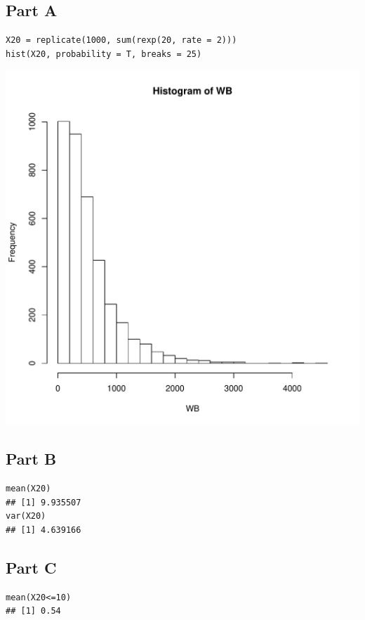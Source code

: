 \documentclass{article}\usepackage[]{graphicx}\usepackage[]{color}
\makeatletter
\newenvironment{kframe}{%
 \def\at@end@of@kframe{}%
 \ifinner\ifhmode%
  \def\at@end@of@kframe{\end{minipage}}%
  \begin{minipage}{\columnwidth}%
 \fi\fi%
 \def\FrameCommand##1{\hskip\@totalleftmargin \hskip-\fboxsep
 \colorbox{shadecolor}{##1}\hskip-\fboxsep
     \hskip-\linewidth \hskip-\@totalleftmargin \hskip\columnwidth}%
 \MakeFramed {\advance\hsize-\width
   \@totalleftmargin\z@ \linewidth\hsize
   \@setminipage}}%
 {\par\unskip\endMakeFramed%
 \at@end@of@kframe}
\newenvironment{knitrout}{}{} %
\makeatother
\begin{document}
\subsection*{Part A}
\begin{knitrout}
\color{fgcolor}\begin{kframe}
\begin{verbatim}
X20 = replicate(1000, sum(rexp(20, rate = 2)))
hist(X20, probability = T, breaks = 25)
\end{verbatim}
\end{kframe}
\includegraphics[width=0.33\linewidth]{figure/unnamed-chunk-5-1} 

\end{knitrout}
\subsection*{Part B}
\begin{knitrout}
\color{fgcolor}\begin{kframe}
\begin{verbatim}
mean(X20)
## [1] 9.935507
var(X20)
## [1] 4.639166
\end{verbatim}
\end{kframe}
\end{knitrout}
\subsection*{Part C}
\begin{knitrout}
\color{fgcolor}\begin{kframe}
\begin{verbatim}
mean(X20<=10)
## [1] 0.54
\end{verbatim}
\end{kframe}
\end{knitrout}
\end{document}
